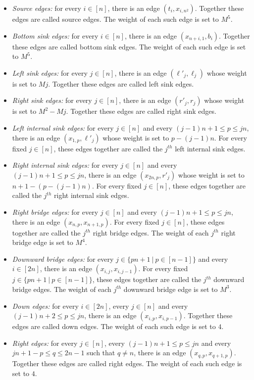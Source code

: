 \begin{itemize}
\item \emph{Source edges:} for every $i \in [n]$, there is an edge $(t_i,x_{i,n^2})$. Together these edges are called source edges. The weight of each such edge is set to $M^5$.
\item \emph{Bottom sink edges:} for every $i \in [n]$, there is an edge $(x_{n+i,1},b_i)$. Together these edges are called bottom sink edges. The weight of each such edge is set to $M^5$.
\item \emph{Left sink edges:} for every $j \in [n]$, there is an edge $(\ell'_j,\ell_j)$ whose weight is set to $Mj$. Together these edges are called left sink edges.
\item  \emph{Right sink edges:} for every $j \in [n]$, there is an edge $(r'_j,r_j)$ whose weight is set to $M^2-Mj$. Together these edges are called right sink edges.
\item \emph{Left internal sink edges:} for every $j \in [n]$ and every $(j-1)n+1 \leq p \leq jn$, there is an edge $(x_{1,p},\ell'_j)$ whose weight is set to $p-(j-1)n$. For every fixed $j \in [n]$, these edges together are called the $j^{th}$ left internal sink edges.
\item \emph{Right internal sink edges:} for every $j \in [n]$ and every $(j-1)n + 1 \leq p \leq jn$, there is an edge $(x_{2n,p},r'_j)$ whose weight is set to $n+1-(p-(j-1)n)$. For every fixed $j \in [n]$, these edges together are called the $j^{th}$ right internal sink edges.
\item \emph{Right bridge edges:} for every $j \in [n]$ and every $(j-1)n + 1 \leq p \leq jn$, there is an edge $(x_{n,p},x_{n+1,p})$. For every fixed $j \in [n]$, these edges together are called the $j^{th}$ right bridge edges. The weight of each $j^{th}$ right bridge edge is set to $M^4$.
\item \emph{Downward bridge edges:} for every $j \in \{pn+1~|~p \in [n-1]\}$ and every $i \in [2n]$, there is an edge $(x_{i,j},x_{i,j-1})$. For every fixed $j \in \{pn+1~|~p \in [n-1]\}$, these edges together are called the $j^{th}$ downward bridge edges. The weight of each $j^{th}$ downward bridge edge is set to $M^3$.
\item \emph{Down edges:} for every $i \in [2n]$, every $j \in [n]$ and every $(j-1)n + 2 \leq p \leq jn$, there is an edge $(x_{i,p},x_{i,p-1})$. Together these edges are called down edges. The weight of each such edge is set to $4$.
\item \emph{Right edges:} for every $j \in [n]$, every $(j-1)n+1 \leq p \leq jn$ and every $ jn+1-p \leq q \leq 2n-1$ such that $q \neq n$, there is an edge $(x_{q,p},x_{q+1,p})$. Together these edges are called right edges. The weight of each such edge is set to $4$.

\end{itemize}
